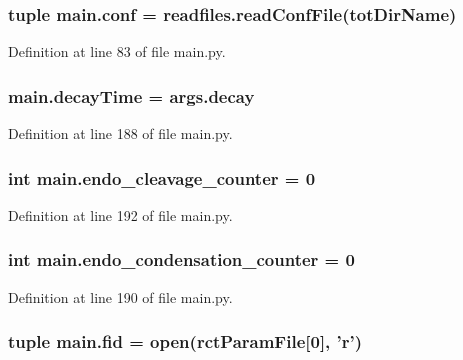 \hypertarget{a00151_adc567db25548116293968a9102beab98}{
\subsubsection[{conf}]{\setlength{\rightskip}{0pt plus 5cm}tuple main.\-conf = readfiles.\-read\-Conf\-File({\bf tot\-Dir\-Name})}}\label{a00151_adc567db25548116293968a9102beab98}


Definition at line 83 of file main.\-py.

\hypertarget{a00151_a5517c07ae046c271d6291e9b3f7d139d}{
\subsubsection[{decay\-Time}]{\setlength{\rightskip}{0pt plus 5cm}main.\-decay\-Time = args.\-decay}}\label{a00151_a5517c07ae046c271d6291e9b3f7d139d}


Definition at line 188 of file main.\-py.

\hypertarget{a00151_a17b22b48a2afe0223186b4275fe5ba70}{
\subsubsection[{endo\-\_\-cleavage\-\_\-counter}]{\setlength{\rightskip}{0pt plus 5cm}int main.\-endo\-\_\-cleavage\-\_\-counter = 0}}\label{a00151_a17b22b48a2afe0223186b4275fe5ba70}


Definition at line 192 of file main.\-py.

\hypertarget{a00151_a0521d81d319c4d79433b5fb65a6da1c2}{
\subsubsection[{endo\-\_\-condensation\-\_\-counter}]{\setlength{\rightskip}{0pt plus 5cm}int main.\-endo\-\_\-condensation\-\_\-counter = 0}}\label{a00151_a0521d81d319c4d79433b5fb65a6da1c2}


Definition at line 190 of file main.\-py.

\hypertarget{a00151_a68ab0ffa4b5ff1cceff01f4abe686ad0}{
\subsubsection[{fid}]{\setlength{\rightskip}{0pt plus 5cm}tuple main.\-fid = open({\bf rct\-Param\-File}\mbox{[}0\mbox{]}, '{\bf r}')}}\label{a00151_a68ab0ffa4b5ff1cceff01f4abe686ad0}


